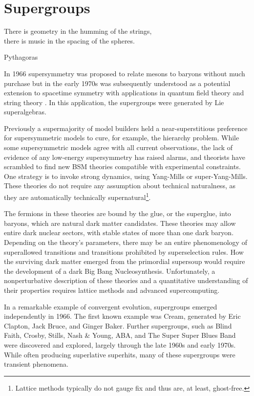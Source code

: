 \section{Supergroups}

\epigraph{There is geometry in the humming of the strings,\\
there is music in the spacing of the spheres.}{Pythagoras}


In 1966 supersymmetry was proposed to relate mesons to baryons\cite{doi:10.1143/PTP.36.1266} without much purchase but in the early 1970s was subsequently understood as a potential extension to spacetime symmetry with applications in quantum field theory and string theory \cite{Gervais:1971ji,Ramond:1971gb,Volkov:1973ix,Wess:1974tw}.
In this application, the supergroups were generated by Lie superalgebras.

Previously a supermajority of model builders held a near-superstitious preference for supersymmetric models to cure, for example, the hierarchy problem.
While some supersymmetric models agree with all current observations\cite{fox:2005}, the lack of evidence of any low-energy supersymmetry has raised alarms, and theorists have scrambled to find new BSM theories compatible with experimental constraints.
One strategy is to invoke strong dynamics, using Yang-Mills or super-Yang-Mills.
These theories do not require any assumption about technical naturalness, as they are automatically technically supernatural\footnote{Lattice methods typically do not gauge fix and thus are, at least, ghost-free.}.

The fermions in these theories are bound by the glue, or the superglue, into baryons, which are natural dark matter candidates.
These theories may allow entire dark nuclear sectors, with stable states of more than one dark baryon.
Depending on the theory's parameters, there may be an entire phenomenology of superallowed transitions and transitions prohibited by superselection rules.
How the surviving dark matter emerged from the primordial supersoup would require the development of a dark Big Bang Nucleosynthesis.
Unfortunately, a nonperturbative description of these theories and a quantitative understanding of their properties requires lattice methods and advanced supercomputing\cite{Detmold:2014qqa,Detmold:2014kba}.

In a remarkable example of convergent evolution, supergroups emerged independently in 1966.
The first known example was Cream, generated by Eric Clapton, Jack Bruce, and Ginger Baker\cite{supergroups}.
Further supergroups, such as Blind Faith, Crosby, Stills, Nash \& Young, ABA, and The Super Super Blues Band\cite{supersuperblues} were discovered and explored, largely through the late 1960s and early 1970s.
While often producing superlative superhits, many of these supergroups were transient phenomena.